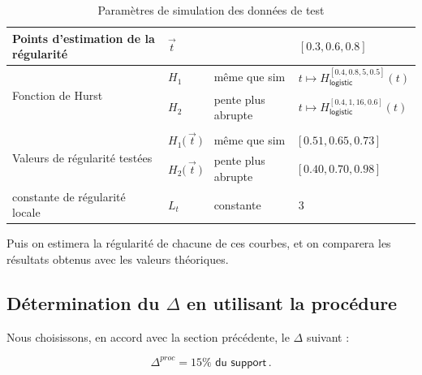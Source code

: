 \begin{table}[H]
\begin{tabularx}{\textwidth}{XXXX}
		\midrule
		Points d'estimation de la régularité                & $\vec t$                        &                    & $[0.3, 0.6, 0.8]$                                         \\
		\midrule
		\multirow{2}{\hsize}{Fonction de Hurst}             & $H_1$                           & même que sim       & $t \mapsto H^{[0.4, 0.8, 5, 0.5]}_{\textsf{logistic}}(t)$ \\
		                                                    & $H_2$                           & pente plus abrupte & $t \mapsto H^{[0.4, 1, 16, 0.6]}_{\textsf{logistic}}(t)$  \\
		\\
		\multirow{2}{\hsize}{Valeurs de régularité testées} & $H_1\bigl( \, \vec t \, \bigr)$ & même que sim       & $\bigl[ \, 0.51, 0.65, 0.73 \, \bigr]$                    \\
		                                                    & $H_2\bigl( \, \vec t \, \bigr)$ & pente plus abrupte & $\bigl[ \, 0.40, 0.70, 0.98 \, \bigr]$                    \\
		\midrule
		constante de régularité locale                      & $L_t$                           & constante          & 3                                                         \\
		\bottomrule
	\end{tabularx}
	\caption{Paramètres de simulation des données de test}
	\label{tab:sim_test_params}
\end{table}

\noindent Puis on estimera la régularité de chacune de ces courbes, et on comparera les résultats obtenus avec les valeurs théoriques.

\subsection{Détermination du $\Delta$ en utilisant la procédure}

Nous choisissons, en accord avec la section précédente, le $\Delta$ suivant :

\begin{equation*}
	\Delta^{proc} = 15\% \textsf{ du support} \,  .
\end{equation*}


